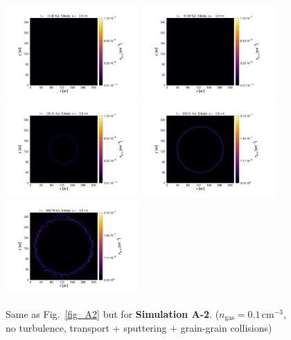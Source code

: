 \documentclass[fleqn,usenatbib]{mnras}
\begin{document}
\begin{figure}
  \includegraphics[trim=2.8cm 1.5cm 9.3cm 2.0cm, clip=true,page=4,height = 3.6cm]{Pics/Pics_C2/Density_1_00041.pdf}\hspace*{-0.05cm} 
 \includegraphics[trim=5.2cm 1.5cm 9.3cm 2.0cm, clip=true,page=4,height = 3.6cm]{Pics/Pics_C2/Density_1_00201.pdf}\hspace*{-0.05cm} 
 \includegraphics[trim=5.2cm 1.5cm 9.3cm 2.0cm, clip=true,page=4,height = 3.6cm]{Pics/Pics_C2/Density_1_00501.pdf}\hspace*{-0.05cm}  
 \includegraphics[trim=5.2cm 1.5cm 9.3cm 2.0cm, clip=true,page=4,height = 3.6cm]{Pics/Pics_C2/Density_1_02001.pdf}\hspace*{-0.05cm} 
 \includegraphics[trim=5.2cm 1.5cm 3.2cm 2.0cm, clip=true,page=4,height = 3.6cm]{Pics/Pics_C2/Density_1_04000.pdf}\\
  \caption{Same as Fig.~\ref{fig_A2} but for \textbf{Simulation A-2}. ($n_\text{gas}=0.1\,\text{cm}^{-3}$, no turbulence, transport + sputtering + grain-grain collisions)}
   \label{fig_C2} 
  \end{figure}  
  
\end{document}
